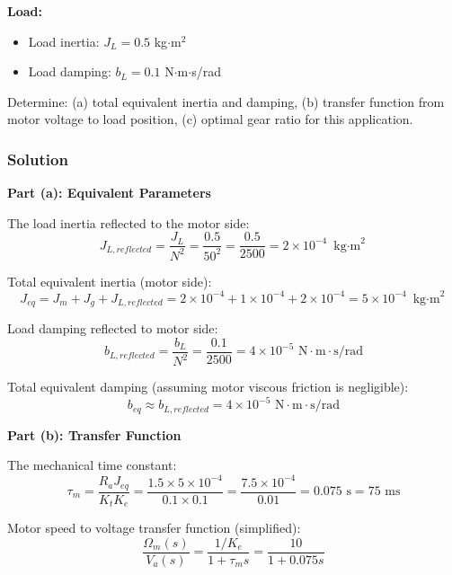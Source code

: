 \textbf{Load:}
\begin{itemize}
    \item Load inertia: $J_L = 0.5$ kg$\cdot$m$^2$
    \item Load damping: $b_L = 0.1$ N$\cdot$m$\cdot$s/rad
\end{itemize}

Determine: (a) total equivalent inertia and damping, (b) transfer function from motor voltage to load position, (c) optimal gear ratio for this application.

\subsubsection{Solution}

\textbf{Part (a): Equivalent Parameters}

The load inertia reflected to the motor side:
\begin{equation}
    J_{L,reflected} = \frac{J_L}{N^2} = \frac{0.5}{50^2} = \frac{0.5}{2500} = 2 \times 10^{-4} \text{ kg$\cdot$m}^2
\end{equation}

Total equivalent inertia (motor side):
\begin{equation}
    J_{eq} = J_m + J_g + J_{L,reflected} = 2 \times 10^{-4} + 1 \times 10^{-4} + 2 \times 10^{-4} = 5 \times 10^{-4} \text{ kg$\cdot$m}^2
\end{equation}

Load damping reflected to motor side:
\begin{equation}
    b_{L,reflected} = \frac{b_L}{N^2} = \frac{0.1}{2500} = 4 \times 10^{-5} \text{ N$\cdot$m$\cdot$s/rad}
\end{equation}

Total equivalent damping (assuming motor viscous friction is negligible):
\begin{equation}
    b_{eq} \approx b_{L,reflected} = 4 \times 10^{-5} \text{ N$\cdot$m$\cdot$s/rad}
\end{equation}

\textbf{Part (b): Transfer Function}

The mechanical time constant:
\begin{equation}
    \tau_m = \frac{R_a J_{eq}}{K_t K_e} = \frac{1.5 \times 5 \times 10^{-4}}{0.1 \times 0.1} = \frac{7.5 \times 10^{-4}}{0.01} = 0.075 \text{ s} = 75 \text{ ms}
\end{equation}

Motor speed to voltage transfer function (simplified):
\begin{equation}
    \frac{\Omega_m(s)}{V_a(s)} = \frac{1/K_e}{1 + \tau_m s} = \frac{10}{1 + 0.075s}
\end{equation}

